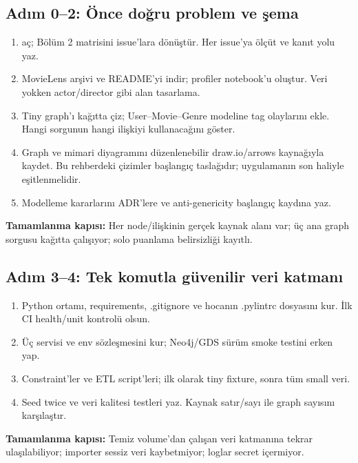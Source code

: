 \documentclass[11pt,a4paper]{article}
\newcommand{\code}[1]{\texttt{\detokenize{#1}}}
\newcommand{\gate}[1]{\par\smallskip\noindent\colorbox{pale}{\parbox{0.96\linewidth}{\textbf{Tamamlanma kapısı:} #1}}\par\smallskip}
\begin{document}
\subsection{Adım 0--2: Önce doğru problem ve şema}
\begin{enumerate}
\item \code{docs/requirements.md} aç; Bölüm 2 matrisini issue'lara dönüştür. Her issue'ya ölçüt ve kanıt yolu yaz.
\item MovieLens arşivi ve README'yi indir; profiler notebook'u oluştur. Veri yokken actor/director gibi alan tasarlama.
\item Tiny graph'ı kağıtta çiz; User--Movie--Genre modeline tag olaylarını ekle. Hangi sorgunun hangi ilişkiyi kullanacağını göster.
\item Graph ve mimari diyagramını düzenlenebilir draw.io/arrows kaynağıyla kaydet. Bu rehberdeki çizimler başlangıç taslağıdır; uygulamanın son haliyle eşitlenmelidir.
\item Modelleme kararlarını ADR'lere ve anti-genericity başlangıç kaydına yaz.
\end{enumerate}
\gate{Her node/ilişkinin gerçek kaynak alanı var; üç ana graph sorgusu kağıtta çalışıyor; solo puanlama belirsizliği kayıtlı.}

\subsection{Adım 3--4: Tek komutla güvenilir veri katmanı}
\begin{enumerate}
\item Python ortamı, requirements, .gitignore ve hocanın .pylintrc dosyasını kur. İlk CI health/unit kontrolü olsun.
\item Üç servisi ve env sözleşmesini kur; Neo4j/GDS sürüm smoke testini erken yap.
\item Constraint'ler ve ETL script'leri; ilk olarak tiny fixture, sonra tüm small veri.
\item Seed twice ve veri kalitesi testleri yaz. Kaynak satır/sayı ile graph sayısını karşılaştır.
\end{enumerate}
\gate{Temiz volume'dan çalışan veri katmanına tekrar ulaşılabiliyor; importer sessiz veri kaybetmiyor; loglar secret içermiyor.}
\end{document}
